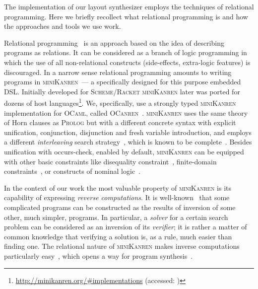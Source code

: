 

The implementation of our layout synthesizer employs the techniques of relational programming. Here
we briefly recollect what relational programming is and how the approaches and tools we use work.

Relational programming~\cite{TRS} is an approach based on the idea of describing programs as relations.
It can be considered as a branch of logic programming in which the use of
all non-relational constructs (side-effects, extra-logic features) is discouraged.
In a narrow sense relational programming amounts to writing programs in \textsc{miniKanren}~--- a specifically designed for this purpose embedded DSL.
Initially developed for \textsc{Scheme}/\textsc{Racket}
\textsc{miniKanren} later was ported for dozens of host
languages\footnote{\url{http://minikanren.org/\#implementations} (accessed: )}.
We, specifically, use a strongly typed \textsc{miniKanren} implementation for \textsc{OCaml}, called \textsc{OCanren}~\cite{OCanren}.
\textsc{miniKanren} uses the same theory of Horn clauses as \textsc{Prolog} but with a different
concrete syntax with explicit unification, conjunction, disjunction and fresh variable introduction, and
employs a different \emph{interleaving} search strategy~\cite{interleaving}, which is known to be complete~\cite{certified}.
Besides unification with occurs-check, enabled by default, \textsc{miniKanren} can be equipped with other
basic constraints like disequality constraint~\cite{disuni}, finite-domain constraints~\cite{cKanren}, or
constructs of nominal logic~\cite{aKanren}.

In the context of our work the most valuable property of \textsc{miniKanren} is its capability of expressing \emph{reverse computations}.
It is well-known~\cite{SemanticsModifiers,SemanticsModifiers1} that some complicated programs can be constructed as
the results of inversion of some other, much simpler, programs.
In particular, a \emph{solver} for a
certain search problem can be considered as an inversion of its \emph{verifier}; it is rather a matter of common knowledge that verifying a
solution is, as a rule, much easier than finding one.
The relational nature of \textsc{miniKanren} makes
inverse computations particularly easy~\cite{searchproblems}, which opens a way for program
synthesis~\cite{Untagged,WBirdSeven,PatternMatching}.


